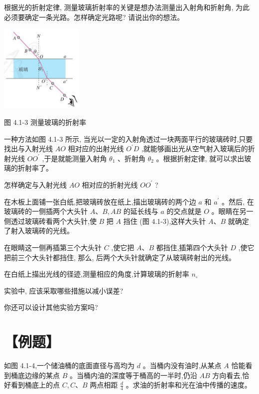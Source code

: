 \documentclass[10pt]{article}
\begin{document}
根据光的折射定律, 测量玻璃折射率的关键是想办法测量出入射角和折射角, 为此必须要确定一条光路。怎样确定光路呢? 请说出你的想法。

\begin{center}
\includegraphics[max width=0.3\textwidth]{images/01910e4c-ebb8-7d2c-8f2f-2375bc1d2d12_92_889979.jpg}
\end{center}

图 4.1-3 测量玻璃的折射率

一种方法如图 4.1-3 所示, 当光以一定的入射角透过一块两面平行的玻璃砖时,只要找出与入射光线 \({AO}\) 相对应的出射光线 \({O}^{\prime }D\) ,就能够画出光从空气射入玻璃后的折射光线 \(O{O}^{\prime }\) ,于是就能测量入射角 \({\theta }_{1}\) 、折射角 \({\theta }_{2}\) 。根据折射定律, 就可以求出玻璃的折射率了。

怎样确定与入射光线 \({AO}\) 相对应的折射光线 \(O{O}^{\prime }\) ?

在木板上面铺一张白纸,把玻璃砖放在纸上,描出玻璃砖的两个边 \(a\) 和 \({a}^{\prime }\) 。然后, 在玻璃砖的一侧插两个大头针 \(A\text{、}B,{AB}\) 的延长线与 \(a\) 的交点就是 \(O\) 。眼睛在另一侧透过玻璃砖看两个大头针,使 \(B\) 把 \(A\) 挡住 (图 4.1-3),这样大头针 \(A\text{、}B\) 就确定了射入玻璃砖的光线。

在眼睛这一侧再插第三个大头针 \(C\) ,使它把 \(A\text{、}B\) 都挡住,插第四个大头针 \(D\) ,使它把前三个大头针都挡住, 那么, 后两个大头针就确定了从玻璃砖射出的光线。

在白纸上描出光线的径迹,测量相应的角度,计算玻璃的折射率 \({n}_{ \circ }\)

实验中, 应该采取哪些措施以减小误差?

你还可以设计其他实验方案吗?

\section*{【例题】}

如图 4.1-4,一个储油桶的底面直径与高均为 \(d\) 。当桶内没有油时,从某点 \(A\) 恰能看到桶底边缘的某点 \(B\) 。当桶内油的深度等于桶高的一半时,仍沿 \({AB}\) 方向看去,恰好看到桶底上的点 \(C,C\text{、}B\) 两点相距 \(\frac{d}{4}\) 。求油的折射率和光在油中传播的速度。
\end{document}
